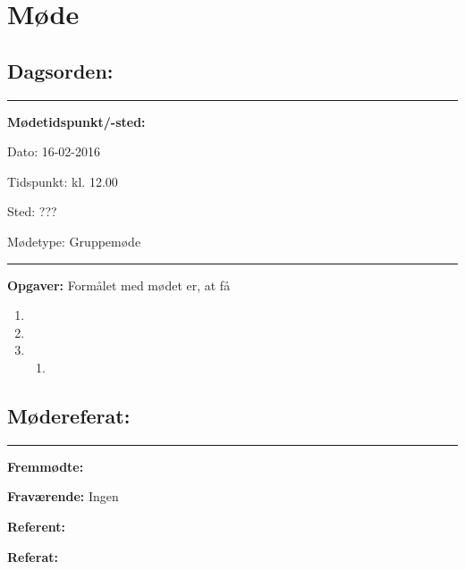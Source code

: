 

\raggedbottom



\frontmatter

\chapter{Møde}

\section{Dagsorden:}

\vspace{0cm}
\hrule
\vspace{0.5cm}

\textbf{Mødetidspunkt/-sted:}

Dato: \tabto{7em} 16-02-2016

Tidspunkt: \tabto{7em} kl. 12.00

Sted: \tabto{7em} ???

Mødetype: \tabto{7em} Gruppemøde

\vspace{0.5cm}
\hrule
\vspace{0.5cm}

\textbf{Opgaver:} \newline
Formålet med mødet er, at få 
\begin{enumerate}
\item 

\item 

\item 
\begin{enumerate}
\item 
\end{enumerate}
\end{enumerate}

\newpage

\section{Mødereferat:}

\vspace{0cm}
\hrule
\vspace{0.5cm}

\textbf{Fremmødte:}

\textbf{Fraværende:} Ingen

\textbf{Referent:}

\textbf{Referat:}

